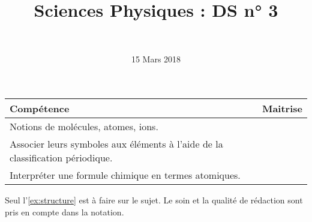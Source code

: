 \documentclass[a4paper,11pt]{exam}
\author{\ }
\date{15 Mars 2018}
\title{Sciences Physiques : DS n° 3}
\begin{document}
%	

	\maketitle
	
\begin{small}
	\begin{center}
		\begin{tabular}{|@{\ }l@{}|@{\ }c@{\ }|}
			\hline
			\textbf{Compétence} & \textbf{Maitrise} \\
			\hline
		Notions de molécules, atomes, ions. \ \ &  \ \ \ \\
			\hline
			Associer leurs symboles aux éléments à l’aide de la classification périodique. \ &  \\
			\hline
			Interpréter une formule chimique en termes atomiques. &  \\
			\hline
		\end{tabular}
	\end{center}
\end{small}	
	
	

Seul l'\ref{ex:structure} est à faire sur le sujet. Le soin et la qualité de rédaction sont pris en compte dans la notation.


%
%
%

%






%










\newpage 









 
%
\ \label{LastPage}
\end{document}
